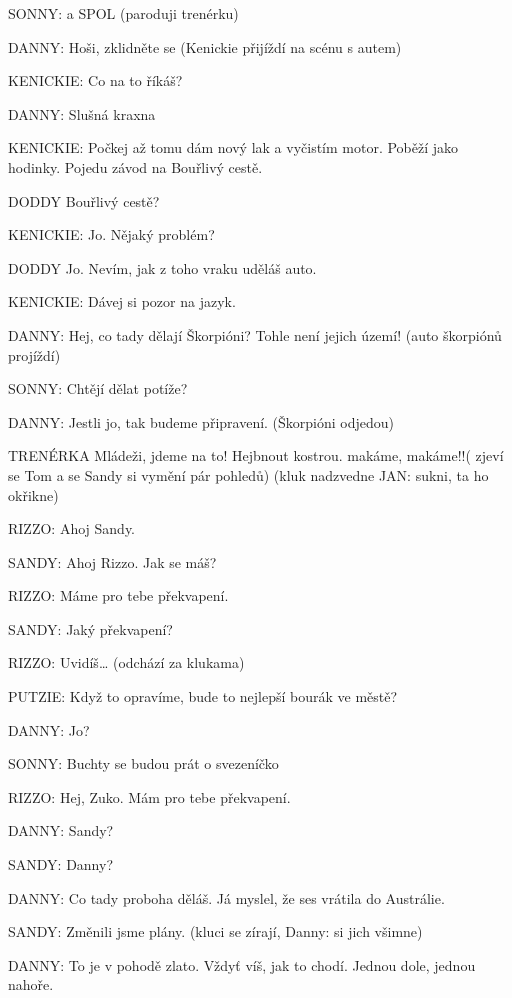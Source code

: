  \rep SONNY: a SPOL  (paroduji trenérku)

 \rep DANNY:        Hoši, zklidněte se  (Kenickie přijíždí na scénu s autem)

\rep KENICKIE:        Co na to říkáš?

\rep DANNY:        Slušná kraxna

\rep KENICKIE:        Počkej až tomu dám nový lak a vyčistím motor. Poběží jako hodinky.                     Pojedu závod na Bouřlivý cestě. 

DODDY        Bouřlivý cestě?

\rep KENICKIE:        Jo. Nějaký problém?

DODDY        Jo. Nevím, jak z toho vraku uděláš auto. 

\rep KENICKIE:        Dávej si pozor na jazyk.

\rep DANNY:        Hej, co tady dělají Škorpióni? Tohle není jejich území! (auto škorpiónů         projíždí)

\rep SONNY:          Chtějí dělat potíže?

\rep DANNY:         Jestli jo, tak budeme připravení. (Škorpióni odjedou)

TRENÉRKA        Mládeži, jdeme na to! Hejbnout kostrou. makáme, makáme!!( zjeví se Tom a se Sandy si vymění pár pohledů)  (kluk nadzvedne \rep JAN: sukni, ta ho okřikne)

\rep RIZZO:        Ahoj Sandy.

\rep SANDY:        Ahoj Rizzo. Jak se máš?

\rep RIZZO:        Máme pro tebe překvapení.

\rep SANDY:        Jaký překvapení?

\rep RIZZO:        Uvidíš…    (odchází za klukama)

\rep PUTZIE:        Když to opravíme, bude to nejlepší bourák ve městě?

\rep DANNY:        Jo?

\rep SONNY:        Buchty se budou prát o svezeníčko

\rep RIZZO:        Hej, Zuko. Mám pro tebe překvapení.

\rep DANNY:        Sandy?

\rep SANDY:        Danny?

\rep DANNY:        Co tady proboha děláš. Já myslel, že ses vrátila do Austrálie. 

\rep SANDY:        Změnili jsme plány. (kluci se zírají, \rep Danny: si jich všimne)

\rep DANNY:        To je v pohodě zlato. Vždyť víš, jak to chodí. Jednou dole, jednou nahoře. 

